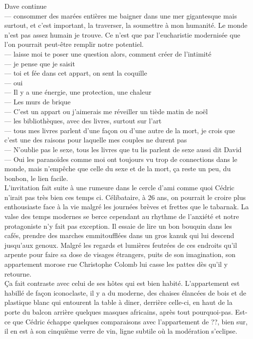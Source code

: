 \documentclass{article}
\begin{document}
Dave continue\\
--- consommer des marées entières me baigner dans une mer gigantesque mais surtout,
et c'est important, la traverser, la soumettre à mon humanité. Le monde n'est pas assez
humain je trouve. Ce n'est que par l'eucharistie modernisée que l'on pourrait peut-être
remplir notre potentiel.\\
--- laisse moi te poser une question alors, comment créer de l'intimité\\
--- je pense que je saisit\\
--- toi et fée dans cet appart, on sent la coquille\\
--- oui\\
--- Il y a une énergie, une protection, une chaleur\\
--- Les murs de brique\\
--- C'est un appart ou j'aimerais me réveiller un tiède matin de noël\\
--- les bibliothèques, avec des livres, surtout sur l'art\\
--- tous mes livres parlent d'une façon ou d'une autre de la mort,
je crois que c'est une des raisons pour laquelle mes couples ne durent pas\\
--- N'oublie pas le sexe, tous les livres que tu lis parlent de sexe aussi dit David\\
--- Oui les paranoïdes comme moi ont toujours vu trop de connections dans le monde,
mais n'empêche que celle du sexe et de la mort, ça reste un peu, du bonbon, le lien
facile.\\

L'invitation fait suite à une rumeure dans le cercle d'ami comme quoi Cédric
n'irait pas très bien ces temps ci. Célibataire, à 26 ans, on pourrait le croire
plus enthousiaste face à la vie malgré les journées brèves et frettes que le
tabarnak. La valse des temps modernes se berce cependant au rhythme de l'anxiété
et notre protagoniste n'y fait pas exception. Il essaie de lire un bon bouquin
dans les cafés, prendre des marches emmitoufflées dans un gros kanuk qui lui
descend jusqu'aux genoux. Malgré les regards et lumières feutrées de ces
endroits qu'il arpente pour faire sa dose de visages étrangers, puits de son
imagination, son appartement morose rue Christophe Colomb lui casse les pattes
dès qu'il y retourne.\\

Ça fait contraste avec celui de ses hôtes qui est bien habité. L'appartement est
habillé de façon iconoclaste, il y a du moderne, des chaises élancées de bois et
de plastique blanc qui entourent la table à diner, derrière celle-ci, en haut de
la porte du balcon arrière quelques masques africains, après tout
pourquoi-pas. Est-ce que Cédric échappe quelques comparaisons avec l'appartement
de ??, bien sur, il en est à son cinquième verre de vin, ligne subtile où la
modération s'eclipse. \\
\end{document}
